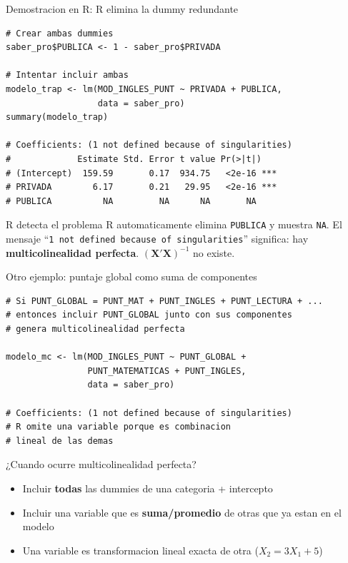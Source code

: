 \documentclass[aspectratio=169, 11pt]{beamer}
\begin{document}
\begin{frame}[fragile]{Demostracion en R: R elimina la dummy redundante}
\begin{lstlisting}[basicstyle=\ttfamily\scriptsize]
# Crear ambas dummies
saber_pro$PUBLICA <- 1 - saber_pro$PRIVADA

# Intentar incluir ambas
modelo_trap <- lm(MOD_INGLES_PUNT ~ PRIVADA + PUBLICA,
                  data = saber_pro)
summary(modelo_trap)

# Coefficients: (1 not defined because of singularities)
#             Estimate Std. Error t value Pr(>|t|)
# (Intercept)  159.59       0.17  934.75   <2e-16 ***
# PRIVADA        6.17       0.21   29.95   <2e-16 ***
# PUBLICA          NA         NA      NA       NA
\end{lstlisting}

\vspace{0.2cm}
\begin{alertblock}{R detecta el problema}
\small R automaticamente elimina \texttt{PUBLICA} y muestra \texttt{NA}. El mensaje ``\texttt{1 not defined because of singularities}'' significa: hay \textbf{multicolinealidad perfecta}. $(\mathbf{X}'\mathbf{X})^{-1}$ no existe.
\end{alertblock}
\end{frame}

\begin{frame}[fragile]{Otro ejemplo: puntaje global como suma de componentes}
\small
\begin{lstlisting}[basicstyle=\ttfamily\scriptsize]
# Si PUNT_GLOBAL = PUNT_MAT + PUNT_INGLES + PUNT_LECTURA + ...
# entonces incluir PUNT_GLOBAL junto con sus componentes
# genera multicolinealidad perfecta

modelo_mc <- lm(MOD_INGLES_PUNT ~ PUNT_GLOBAL +
                PUNT_MATEMATICAS + PUNT_INGLES,
                data = saber_pro)

# Coefficients: (1 not defined because of singularities)
# R omite una variable porque es combinacion
# lineal de las demas
\end{lstlisting}

\vspace{0.2cm}
\begin{block}{¿Cuando ocurre multicolinealidad perfecta?}
\begin{itemize}\setlength{\itemsep}{2pt}
  \item Incluir \textbf{todas} las dummies de una categoria + intercepto
  \item Incluir una variable que es \textbf{suma/promedio} de otras que ya estan en el modelo
  \item Una variable es transformacion lineal exacta de otra ($X_2 = 3X_1 + 5$)
\end{itemize}
\end{block}
\end{frame}
\end{document}
